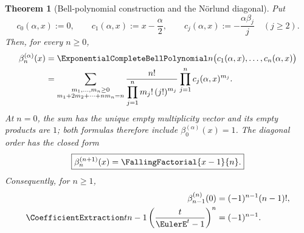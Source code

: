 \documentclass[11pt,a4paper,oneside,openany]{book}
\newtheorem{theorem}{Theorem}[chapter]
\theoremstyle{definition}
\theoremstyle{remark}
\begin{document}
\begin{theorem}[Bell-polynomial construction and the N\"orlund diagonal]
\label{thm:merged-norlund-bell-diagonal}
Put
\begin{equation}
 c_0(\alpha,x):=0,\qquad c_1(\alpha,x):=x-\frac{\alpha}{2},\qquad
 c_j(\alpha,x):=-\frac{\alpha\beta_j}{j}\quad(j\geq2).            \label{eq:merged-norlund-cumulants}
\end{equation}
Then, for every $n\geq0$,
\begin{align}
 \beta_n^{(\alpha)}(x)
 &=\ExponentialCompleteBellPolynomial n
   \bigl(c_1(\alpha,x),\ldots,c_n(\alpha,x)\bigr)                 \label{eq:merged-norlund-bell}\\
 &=\sum_{\substack{m_1,\ldots,m_n\geq0\\m_1+2m_2+\cdots+nm_n=n}}
 \frac{n!}{\displaystyle\prod_{j=1}^{n}m_j!\,(j!)^{m_j}}
 \prod_{j=1}^{n}c_j(\alpha,x)^{m_j}.                             \label{eq:merged-norlund-bell-explicit}
\end{align}
At $n=0$, the sum has the unique empty multiplicity vector and its empty
products are $1$; both formulas therefore include $\beta_0^{(\alpha)}(x)=1$.
The diagonal order has the closed form
\begin{equation}
 \boxed{\displaystyle\beta_n^{(n+1)}(x)=\FallingFactorial{x-1}{n}.} \label{eq:merged-norlund-polynomial-diagonal}
\end{equation}
Consequently, for $n\geq1$,
\begin{align}
 \beta_{n-1}^{(n)}(0)&=(-1)^{n-1}(n-1)!,                          \label{eq:merged-norlund-number-diagonal}\\
 \CoefficientExtraction t{n-1}
 \left(\frac{t}{\EulerE^t-1}\right)^n&=(-1)^{n-1}.              \label{eq:merged-norlund-diagonal}
\end{align}
\end{theorem}
\end{document}
